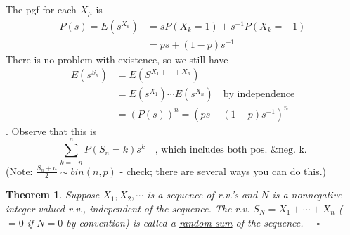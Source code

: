 \documentclass[12pt]{article}
\theoremstyle{definition}
\theoremstyle{plain}
\newtheorem{mythm}{Theorem}[section]
\begin{document}
The pgf for each $X_\mu$ is 
\begin{displaymath}
\begin{aligned}
P(s) = E(s^{X_k}) &= sP(X_k = 1) + s^{-1}P(X_k = -1) \\
			&= ps + (1-p)s^{-1}
\end{aligned}
\end{displaymath}
There is no problem with existence, so we still have 
\begin{displaymath}
\begin{aligned}
E(s^{S_n}) &= E(S^{X_1 + \cdots + X_n}) \\
&=E(s^{X_1}) \cdots E(s^{X_n}) \quad \mbox{by independence}\\
&= (P(s))^n = (ps + (1-p)s^{-1})^n
\end{aligned}
\end{displaymath}. Observe that this is \[\sum_{k = -n}^n P(S_n = k)s^k \quad \mbox{, which includes both pos. \& neg. k.}\] (Note: $\frac{S_n + n}{2} \sim bin(n,p)$ - check; there are several ways you can do this.)
\begin{mythm}
Suppose $X_1, X_2, \cdots$ is a sequence of r.v.'s and $N$ is a nonnegative integer valued r.v., independent of the sequence. The r.v. $S_N = X_1 + \cdots + X_n$ ($=0$ if $N=0$ by convention) is called a \underline{random sum} of the sequence. $\quad \square$
\end{mythm}





































\clearpage
\end{document}
